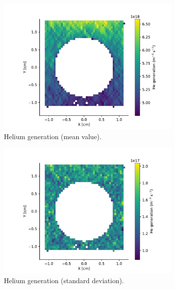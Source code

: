 \begin{figure}
    \centering
    \begin{subfigure}{0.5\linewidth}
        \includegraphics[width=\linewidth]{Figures/Chapter5/helium_generation_in_monoblock.pdf}
        \caption{Helium generation (mean value).}
    \end{subfigure}%
    \begin{subfigure}{0.5\linewidth}
        \includegraphics[width=\linewidth]{Figures/Chapter5/helium_generation_in_monoblock_std_dev.pdf}
        \caption{Helium generation (standard deviation).}
    \end{subfigure}
    \begin{subfigure}{1\linewidth}

\end{subfigure}
\end{figure}

